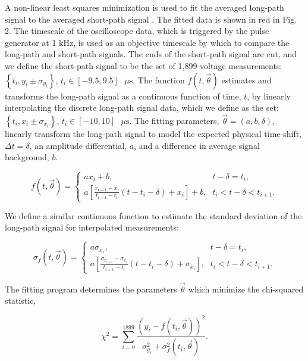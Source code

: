 \documentclass[%
 reprint,
 amsmath,amssymb,
 aps,
]{revtex4-2}
\begin{document}
 A non-linear least squares minimization is used to fit the averaged long-path signal to the averaged short-path signal \cite{scipy}. The fitted data is shown in red in Fig. 2. The timescale of the oscilloscope data, which is triggered by the pulse generator at 1 kHz, is used as an objective timescale by which to compare the long-path and short-path signals. The ends of the short-path signal are cut, and we define the short-path signal to be the set of 1,899 voltage measurements: $\left\{t_i, y_i  \pm \sigma_{y_i}\right\}$, $t_i \in [-9.5,9.5]\text{ }\mu\text{s}$. The function $f(t, \vec{\theta})$ estimates and transforms the long-path signal as a continuous function of time, $t$, by linearly interpolating the discrete long-path signal data, which we define as the set: $\left\{t_i, x_i  \pm \sigma_{x_i}\right\}$, $t_i \in [-10,10]\text{ }\mu\text{s}$. The fitting parameters, $\vec{\theta} = (a,b,\delta)$, linearly transform the long-path signal to model the expected physical time-shift, $\Delta t = \delta$, an amplitude differential, $a$, and a difference in average signal background, $b$.

\begin{equation}
    f(t, \vec{\theta}) = \begin{cases}
    a x_i + b\text{,}  & t - \delta = t_i, \\
    a \left[\frac{x_{i+1} - x_{i}}{t_{i+1} - t_{i}} (t-t_i-\delta) + x_i\right] + b\text{,} & t_i < t - \delta < t_{i+1}.
    \end{cases}
\end{equation}

\noindent We define a similar continuous function to estimate the standard deviation of the long-path signal for interpolated measurements:

\begin{equation}
    \sigma_f(t, \vec{\theta}) = \begin{cases}
    a \sigma_{x_i}\text{,}  & t - \delta = t_i, \\
    a \left[\frac{\sigma_{x_{i+1}} - \sigma_{x_{i}}}{t_{i+1} - t_{i}} (t-t_i-\delta) + \sigma_{x_i}\right]\text{,} & t_i < t - \delta < t_{i+1}.
    \end{cases}
\end{equation}

\noindent The fitting program determines the parameters $\vec{\theta}$ which minimize the chi-squared statistic,

\begin{equation}
    \chi^2 = \sum_{i=0}^{1899} \frac{\left(y_i - f(t_i, \vec{\theta})\right)^2}{\sigma_{y_i}^2 + \sigma_f^2(t_i,\vec{\theta})}.
\end{equation}
\end{document}
